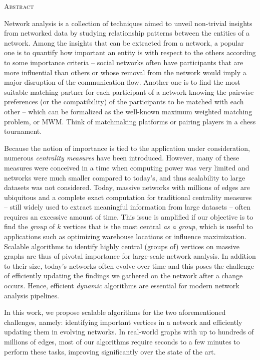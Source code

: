 \pagestyle{plain}
\begin{center}
  \textsc{Abstract}
\end{center}
%
Network analysis is a collection of techniques aimed to unveil non-trivial
insights from networked data by studying relationship patterns between
the entities of a network.
Among the insights that can be extracted from a network, a popular one is to
quantify how important an entity is with respect to the others according to
some importance criteria -- \eg social networks often have
participants that are more influential than others or whose removal from the
network would imply a major disruption of the communication flow.
Another one is to find the most suitable matching partner for each participant
of a network knowing the pairwise preferences (or the compatibility) of the
participants to be matched with each other -- which can be formalized as the
well-known maximum weighted matching problem, or MWM. Think of matchmaking
platforms or pairing players in a chess tournament.

Because the notion of importance is tied to the application under consideration,
numerous \emph{centrality measures} have been introduced.
However, many of these measures were conceived in a time when computing power was very
limited and networks were much smaller compared to today's, and thus scalability
to large datasets was not considered. Today, massive networks with
millions of edges are ubiquitous and a complete exact computation for
traditional centrality measures -- still widely used to extract meaningful
information from large datasets -- often requires an excessive amount of time.
This issue is amplified if our objective is to find the \emph{group} of $k$
vertices that is the most central \emph{as a group}, which is useful to
applications such as optimizing warehouse locations or influence maximization.
Scalable algorithms to identify highly central (groups of) vertices
on massive graphs are thus of pivotal importance for large-scale network analysis.
%
In addition to their size, today's networks often evolve over time and
this poses the challenge of efficiently updating the findings we gathered on
the network after a change occurs.
Hence, efficient \emph{dynamic} algorithms
are essential for modern network analysis
pipelines.

In this work, we propose scalable algorithms for the two
aforementioned challenges, namely: identifying important vertices
in a network
and efficiently updating them in evolving networks.
In real-world graphs with up to hundreds of millions of edges, most of our
algorithms require seconds to a few minutes to perform these tasks, improving
significantly over the state of the art.

